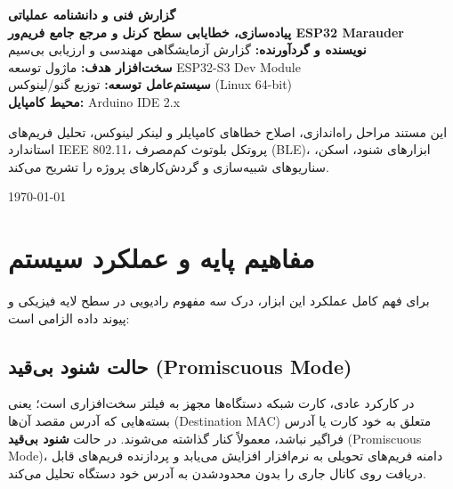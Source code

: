\documentclass[11pt,a4paper]{article}
\newif\ifxepersianavailable
\newcommand{\lr}[1]{\foreignlanguage{english}{#1}}
\newcommand{\en}[1]{\lr{#1}}
\begin{document}
\begin{titlepage}
    \ifxepersianavailable\else\beginR\fi
    \centering
    \vspace*{1.5cm}
    {\Huge\textbf{گزارش فنی و دانشنامه عملیاتی}}\\[0.6cm]
    {\LARGE\textbf{پیاده‌سازی، خطایابی سطح کرنل و مرجع جامع فریم‌ور \en{ESP32 Marauder}}}\\[1.2cm]
    
    \textbf{نویسنده و گردآورنده:} گزارش آزمایشگاهی مهندسی و ارزیابی بی‌سیم\\
    \textbf{سخت‌افزار هدف:} ماژول توسعه \en{ESP32-S3 Dev Module}\\
    \textbf{سیستم‌عامل توسعه:} توزیع گنو/لینوکس \en{(Linux 64-bit)}\\
    \textbf{محیط کامپایل:} \en{Arduino IDE 2.x}
    \vfill
    \begin{tcolorbox}[colback=codebg,colframe=codeframe,arc=2mm]
        \centering
        \small
        این مستند مراحل راه‌اندازی، اصلاح خطاهای کامپایلر و لینکر لینوکس، تحلیل فریم‌های استاندارد \en{IEEE 802.11}، پروتکل بلوتوث کم‌مصرف \en{(BLE)}، ابزارهای شنود، اسکن، سناریوهای شبیه‌سازی و گردش‌کارهای پروژه را تشریح می‌کند.
    \end{tcolorbox}
    \vspace{0.8cm}
    \today
    \ifxepersianavailable\else\endR\fi
\end{titlepage}

\ifxepersianavailable\else\beginR\fi
\tableofcontents
\newpage

\section{مفاهیم پایه و عملکرد سیستم}
برای فهم کامل عملکرد این ابزار، درک سه مفهوم رادیویی در سطح لایه فیزیکی و پیوند داده الزامی است:

\subsection{حالت شنود بی‌قید \en{(Promiscuous Mode)}}
در کارکرد عادی، کارت شبکه دستگاه‌ها مجهز به فیلتر سخت‌افزاری است؛ یعنی بسته‌هایی که آدرس مقصد آن‌ها \en{(Destination MAC)} متعلق به خود کارت یا آدرس فراگیر نباشد، معمولاً کنار گذاشته می‌شوند. در حالت \textbf{شنود بی‌قید} \en{(Promiscuous Mode)}، دامنه فریم‌های تحویلی به نرم‌افزار افزایش می‌یابد و پردازنده فریم‌های قابل دریافت روی کانال جاری را بدون محدودشدن به آدرس خود دستگاه تحلیل می‌کند.
\end{document}
